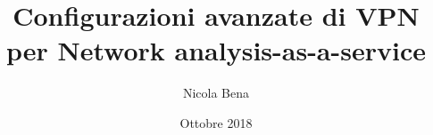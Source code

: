\documentclass{beamer}
\title[Configurazioni avanzate di VPN]{Configurazioni avanzate di VPN per Network analysis-as-a-service}
\author{Nicola Bena}
\date{Ottobre 2018}
\begin{document}
    \frame{\titlepage}

     
 
\end{document}
